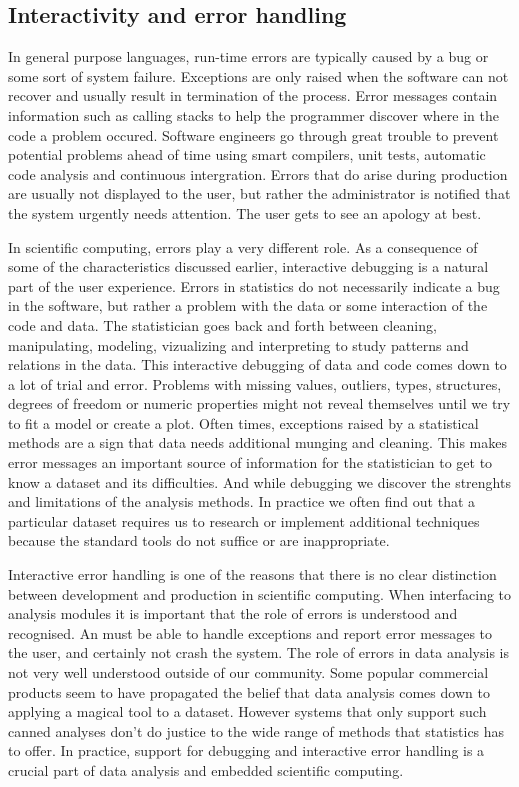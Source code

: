 \subsection{Interactivity and error handling}

In general purpose languages, run-time errors are typically caused by a bug or some sort of system failure. Exceptions are only raised when the software can not recover and usually result in termination of the process. Error messages contain information such as calling stacks to help the programmer discover where in the code a problem occured. Software engineers go through great trouble to prevent potential problems ahead of time using smart compilers, unit tests, automatic code analysis and continuous intergration. Errors that do arise during production are usually not displayed to the user, but rather the administrator is notified that the system urgently needs attention. The user gets to see an apology at best.

In scientific computing, errors play a very different role. As a consequence of some of the characteristics discussed earlier, interactive debugging is a natural part of the user experience. Errors in statistics do not necessarily indicate a bug in the software, but rather a problem with the data or some interaction of the code and data. The statistician goes back and forth between cleaning, manipulating, modeling, vizualizing and interpreting to study patterns and relations in the data. This interactive debugging of data and code comes down to a lot of trial and error. Problems with missing values, outliers, types, structures, degrees of freedom or numeric properties might not reveal themselves until we try to fit a model or create a plot. Often times, exceptions raised by a statistical methods are a sign that data needs additional munging and cleaning. This makes error messages an important source of information for the statistician to get to know a dataset and its difficulties. And while debugging we discover the strenghts and limitations of the analysis methods. In practice we often find out that a particular dataset requires us to research or implement additional techniques because the standard tools do not suffice or are inappropriate.

Interactive error handling is one of the reasons that there is no clear distinction between development and production in scientific computing. When interfacing to analysis modules it is important that the role of errors is understood and recognised. An \API must be able to handle exceptions and report error messages to the user, and certainly not crash the system. The role of errors in data analysis is not very well understood outside of our community. Some popular commercial products seem to have propagated the belief that data analysis comes down to applying a magical tool to a dataset. However systems that only support such canned analyses don't do justice to the wide range of methods that statistics has to offer. In practice, support for debugging and interactive error handling is a crucial part of data analysis and embedded scientific computing.

